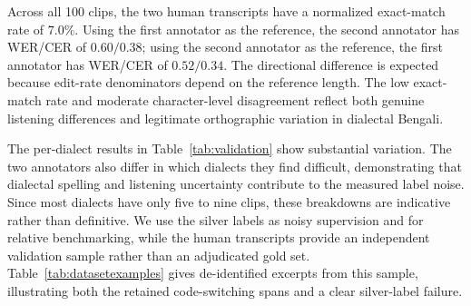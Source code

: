 \documentclass[journal]{IEEEtran}
\begin{document}
Across all 100 clips, the two human transcripts have a normalized exact-match rate of $7.0\%$. Using the first annotator as the reference, the second annotator has WER/CER of $0.60/0.38$; using the second annotator as the reference, the first annotator has WER/CER of $0.52/0.34$. The directional difference is expected because edit-rate denominators depend on the reference length. The low exact-match rate and moderate character-level disagreement reflect both genuine listening differences and legitimate orthographic variation in dialectal Bengali.

The per-dialect results in Table~\ref{tab:validation} show substantial variation. The two annotators also differ in which dialects they find difficult, demonstrating that dialectal spelling and listening uncertainty contribute to the measured label noise. Since most dialects have only five to nine clips, these breakdowns are indicative rather than definitive. We use the silver labels as noisy supervision and for relative benchmarking, while the human transcripts provide an independent validation sample rather than an adjudicated gold set. Table~\ref{tab:datasetexamples} gives de-identified excerpts from this sample, illustrating both the retained code-switching spans and a clear silver-label failure.
\end{document}
